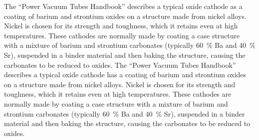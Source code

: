 The ``Power Vacuum Tubes Handbook'' \cite[chp 3.5.2.1]{Whitaker} describes a typical oxide cathode as a coating of barium and strontium oxides on a structure made from nickel alloys. Nickel is chosen for its strength and toughness, which it retains even at high temperatures. These cathodes are normally made by coating a case structure with a mixture of barium and strontium carbonates (typically \SI{60}{\percent} Ba and \SI{40}{\percent} Sr), suspended in a binder material and then baking the structure, causing the carbonates to be reduced to oxides.
The ``Power Vacuum Tubes Handbook'' \cite[chp 3.5.2.1]{Whitaker} describes a typical oxide cathode has a coating of barium and strontium oxides on a structure made from nickel alloys. Nickel is chosen for its strength and toughness, which it retains even at high temperatures. These cathodes are normally made by coating a case structure with a mixture of barium and strontium carbonates (typically \SI{60}{\percent} Ba and \SI{40}{\percent} Sr), suspended in a binder material and then baking the structure, causing the carbonates to be reduced to oxides.

